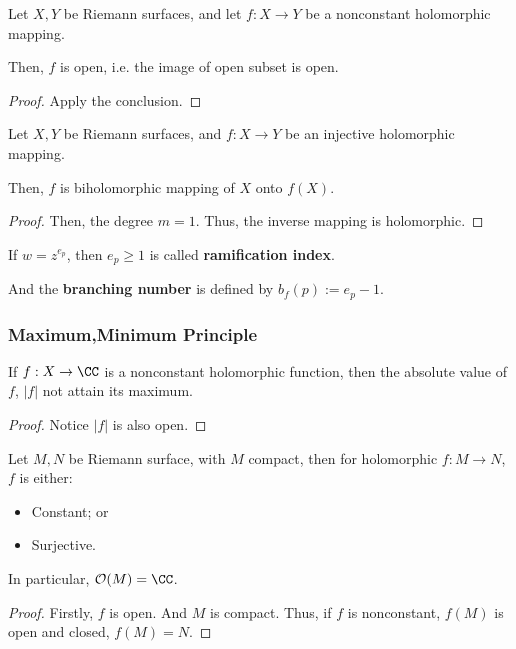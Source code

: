 \documentclass[Total.tex]{subfiles}
\begin{document}
			\begin{corollary}
				Let $X,Y$ be Riemann surfaces, and let $f:X\rightarrow Y$ be a nonconstant holomorphic mapping.
				
				Then, $f$ is open, i.e. the image of open subset is open. 
			\end{corollary}
			\begin{proof}
				Apply the conclusion. 
			\end{proof}
			
			\begin{corollary}
				Let $X,Y$ be Riemann surfaces, and $f:X\rightarrow Y$ be an injective holomorphic mapping. 
				
				Then, $f$ is biholomorphic mapping of $X$ onto $f(X)$. 
			\end{corollary}
			\begin{proof}
				Then, the degree $m=1$. Thus, the inverse mapping is holomorphic. 
			\end{proof}
			
			
			\begin{Def}
				If $w=z^{e_p}$, then $e_p\geq 1$ is called \textbf{ramification index}.
				
				And the \textbf{branching number} is defined by $b_f(p):=e_p-1$. 
			\end{Def}
			
			\subsubsection{Maximum,Minimum Principle}
			\begin{corollary}
				If $f:X\rightarrow \CC$ is a nonconstant holomorphic function, then the absolute value of $f$, $|f|$ not attain its maximum. 
			\end{corollary}
			\begin{proof}
				Notice $|f|$ is also open. 
			\end{proof}
			
			
			\begin{theorem}
				Let $M,N$ be Riemann surface, with $M$ compact, then for holomorphic	$f:M\rightarrow N$, $f$ is either:
				\begin{itemize}
					\item Constant; or
					\item Surjective.
				\end{itemize}
				
				In particular, $\mathcal{O}(M)=\CC$. 
			\end{theorem}
			\begin{proof}
				Firstly, $f$ is open. And $M$ is compact. Thus, if $f$ is nonconstant, $f(M)$ is open and closed, $f(M)=N$. 
			\end{proof}
			
\end{document}
